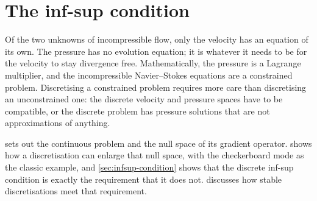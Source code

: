 \chapter{The inf-sup condition}\label{ch:infsup} \pagestyle{mainmatter}
\chapterprecistoc{}


Of the two unknowns of incompressible flow, only the velocity has an equation of its own. The pressure has no evolution equation; it is whatever it needs to be for the velocity to stay divergence free. Mathematically, the pressure is a Lagrange multiplier, and the incompressible Navier--Stokes equations are a constrained problem. Discretising a constrained problem requires more care than discretising an unconstrained one: the discrete velocity and pressure spaces have to be compatible, or the discrete problem has pressure solutions that are not approximations of anything.

 sets out the continuous problem and the null space of its gradient operator.  shows how a discretisation can enlarge that null space, with the checkerboard mode as the classic example, and \cref{sec:infsup-condition} shows that the discrete inf-sup condition is exactly the requirement that it does not.  discusses how stable discretisations meet that requirement.

